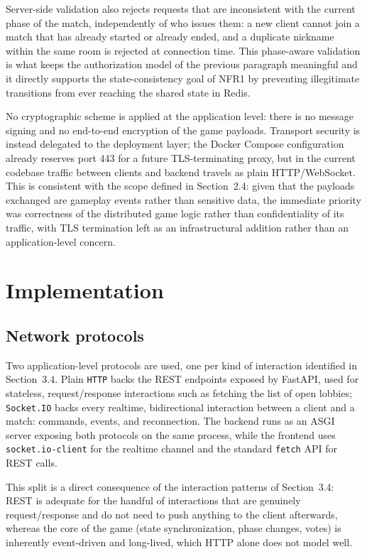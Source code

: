 \documentclass{scrartcl}
\begin{document}
Server-side validation also rejects requests that are inconsistent with the current phase of the match, independently of who issues them: a new client cannot join a match that has already started or already ended, and a duplicate nickname within the same room is rejected at connection time. This phase-aware validation is what keeps the authorization model of the previous paragraph meaningful and it directly supports the state-consistency goal of NFR1 by preventing illegitimate transitions from ever reaching the shared state in Redis.

No cryptographic scheme is applied at the application level: there is no message signing and no end-to-end encryption of the game payloads. Transport security is instead delegated to the deployment layer; the Docker Compose configuration already reserves port 443 for a future TLS-terminating proxy, but in the current codebase traffic between clients and backend travels as plain HTTP/WebSocket. This is consistent with the scope defined in Section~2.4: given that the payloads exchanged are gameplay events rather than sensitive data, the immediate priority was correctness of the distributed game logic rather than confidentiality of its traffic, with TLS termination left as an infrastructural addition rather than an application-level concern.

\section{Implementation}\label{implementation}

\subsection{Network protocols}

Two application-level protocols are used, one per kind of interaction identified in Section~3.4. Plain \texttt{HTTP} backs the REST endpoints exposed by FastAPI, used for stateless, request/response interactions such as fetching the list of open lobbies; \texttt{Socket.IO} backs every realtime, bidirectional interaction between a client and a match: commands, events, and reconnection. The backend runs as an ASGI server exposing both protocols on the same process, while the frontend uses \texttt{socket.io-client} for the realtime channel and the standard \texttt{fetch} API for REST calls.

This split is a direct consequence of the interaction patterns of Section~3.4: REST is adequate for the handful of interactions that are genuinely request/response and do not need to push anything to the client afterwards, whereas the core of the game (state synchronization, phase changes, votes) is inherently event-driven and long-lived, which HTTP alone does not model well.
\end{document}
